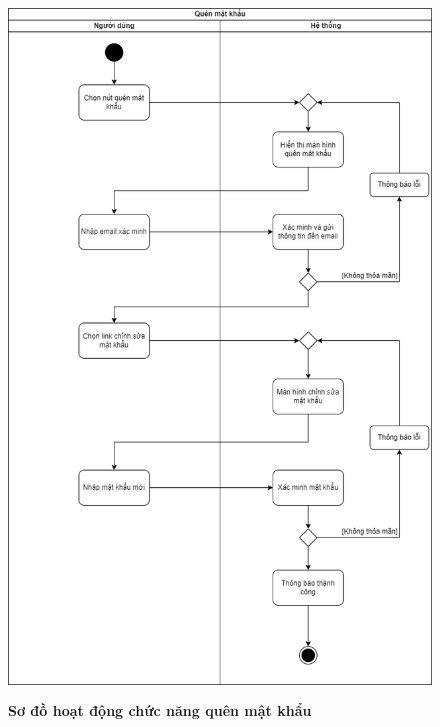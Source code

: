   \begin{figure}[H]
    \centering
    \includegraphics[width=13cm,height=18.5cm]{Images/activity/activity_forgot_pass.png}
    \caption[Sơ đồ hoạt động chức năng quên mật khẩu]{\bfseries \fontsize{12pt}{0pt}
    \selectfont Sơ đồ hoạt động chức năng quên mật khẩu}
    \label{activity_forgot_password} %
  \end{figure}

